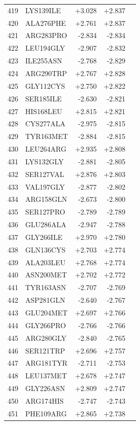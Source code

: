 \begin{longtable}{r l r r c}
419 & LYS139ILE & +3.028 & +2.837 &  \\
420 & ALA276PHE & +2.761 & +2.837 &  \\
421 & ARG283PRO & -2.834 & -2.834 &  \\
422 & LEU194GLY & -2.907 & -2.832 &  \\
423 & ILE255ASN & -2.768 & -2.829 &  \\
424 & ARG290TRP & +2.767 & +2.828 &  \\
425 & GLY112CYS & +2.750 & +2.822 &  \\
426 & SER185ILE & -2.630 & -2.821 &  \\
427 & HIS168LEU & +2.815 & +2.821 &  \\
428 & CYS277ALA & -2.975 & -2.815 &  \\
429 & TYR163MET & -2.884 & -2.815 &  \\
430 & LEU264ARG & +2.935 & +2.808 &  \\
431 & LYS132GLY & -2.881 & -2.805 &  \\
432 & SER127VAL & +2.876 & +2.803 &  \\
433 & VAL197GLY & -2.877 & -2.802 &  \\
434 & ARG158GLN & -2.673 & -2.800 &  \\
435 & SER127PRO & -2.789 & -2.789 &  \\
436 & GLU286ALA & -2.947 & -2.788 &  \\
437 & GLY266ILE & +2.970 & +2.780 &  \\
438 & GLN136CYS & +2.703 & +2.774 &  \\
439 & ALA203LEU & +2.768 & +2.774 &  \\
440 & ASN200MET & +2.702 & +2.772 &  \\
441 & TYR163ASN & -2.707 & -2.769 &  \\
442 & ASP281GLN & -2.640 & -2.767 &  \\
443 & GLU204MET & +2.697 & +2.766 &  \\
444 & GLY266PRO & -2.766 & -2.766 &  \\
445 & ARG280GLY & -2.840 & -2.765 &  \\
446 & SER121TRP & +2.696 & +2.757 &  \\
447 & ARG181TYR & -2.711 & -2.753 &  \\
448 & LEU137MET & +2.678 & +2.747 &  \\
449 & GLY226ASN & +2.809 & +2.747 &  \\
450 & ARG174HIS & -2.747 & -2.743 &  \\
451 & PHE109ARG & +2.865 & +2.738 &  \\

\end{longtable}
